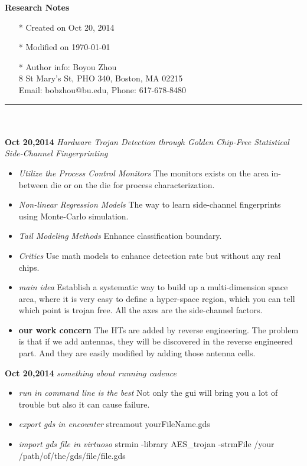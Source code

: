 \documentclass[]{article}
\begin{document}
\pagestyle{empty}
{\large\textbf{Research Notes}}
\begin{itemize}
    \item[*] Created on Oct 20, 2014
    \item[*] Modified on \today
    \item[*] Author info: Boyou Zhou\\
             8 St Mary's St, PHO 340, Boston, MA 02215\\
             Email: bobzhou@bu.edu, Phone: 617-678-8480
\end{itemize}


\rule[-0.1cm]{7.5in}{0.01cm}\\
\\
\noindent \textbf{Oct 20,2014}
\textit{Hardware Trojan Detection through Golden Chip-Free Statistical Side-Channel Fingerprinting}
\indent		\begin{itemize}
                \item \textit{Utilize the Process Control Monitors} The monitors exists on the area
                        in-between die or on the die for process characterization.
                \item \textit{Non-linear Regression Models} The way to learn side-channel fingerprints
                        using Monte-Carlo simulation.
                \item \textit{Tail Modeling Methods} Enhance classification boundary.
                \item \textit{Critics} Use math models to enhance detection rate but without any 
                        real chips.
                \item \textit{main idea} Establish a systematic way to build up a multi-dimension
                        space area, where it is very easy to define a hyper-space region, which you
                        can tell which point is trojan free. All the axes are the side-channel factors.
                \item \textbf{our work concern} The HTs are added by reverse engineering. The problem 
                        is that if we add antennas, they will be discovered in the reverse engineered
                        part. And they are easily modified by adding those antenna cells.

            \end{itemize}

\noindent \textbf{Oct 20,2014}
\textit{something about running cadence}
\indent		\begin{itemize}
                \item \textit{run in command line is the best} Not only the gui will bring you a lot
                        of trouble but also it can cause failure.
                \item \textit{export gds in encounter} streamout yourFileName.gds
                \item \textit{import gds file in virtuoso} strmin -library AES\_trojan -strmFile /your
                        /path/of/the/gds/file/file.gds
            \end{itemize}
\end{document}
